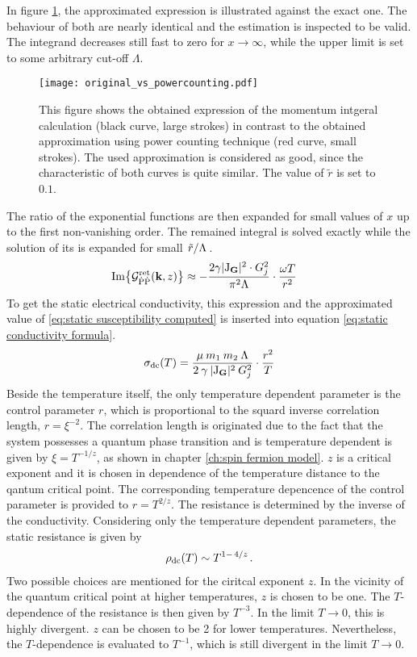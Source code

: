 %
In figure \ref{fig:integrand exact vs approx}, the approximated expression is illustrated against the exact one.
The behaviour of both are nearly identical and the estimation is inspected to be valid.
The integrand decreases still fast to zero for $x \to \infty$, while the upper limit is set to some arbitrary cut-off $\Lambda$.
%
\begin{figure}[t]
	\centering
	\texttt{[image: original\_vs\_powercounting.pdf]}
	\caption{
This figure shows the obtained expression of the momentum intgeral calculation (black curve, large strokes) in contrast to the obtained approximation using power counting technique (red curve, small strokes).
The used approximation is considered as good, since the characteristic of both curves is quite similar.
The value of $\tilde{r}$ is set to $0.1$.
	}
	\label{fig:integrand exact vs approx}
\end{figure}
%
The ratio of the exponential functions are then expanded for small values of $x$ up to the first non-vanishing order.
The remained integral is solved exactly while the solution of its is expanded for small $\flatfrac{\tilde{r}}{\Lambda}$.
%
\begin{align}
	\Im{\mathcal{G}_{\dot{\mathrm{P}}\dot{\mathrm{P}}}^{\mathrm{ret}}(\vb{k}, z)} &\approx 
		-\frac{2 \gamma \vert \mathrm{J}_{\vb{G}} \vert^{2} \cdot G_{j}^{2}}{\pi^{2} \Lambda} \cdot \frac{\omega T}{r^{2}}
\end{align}
%
To get the static electrical conductivity, this expression and the  approximated value of \eqref{eq:static susceptibility computed} is inserted into equation \eqref{eq:static conductivity formula}.
%
\begin{align}
	\sigma_{\mathrm{dc}}(T) = \frac{\mu\: m_{1}\: m_{2}\: \Lambda}{2\: \gamma\: \vert \mathrm{J}_{\vb{G}} \vert^{2}\: G_{j}^{2}} \cdot \frac{r^{2}}{T}
\end{align}
%
Beside the temperature itself, the only temperature dependent parameter is the control parameter $r$, which is proportional to the squard inverse correlation length, $r = \xi^{-2}$.
The correlation length is originated due to the fact that the system possesses a quantum phase transition and is temperature dependent is given by $\xi = T^{-1/z}$, as shown in chapter \ref{ch:spin fermion model}.
$z$ is a critical exponent and it is chosen in dependence of the temperature distance to the qantum critical point.
The corresponding temperature depencence of the control parameter is provided to $r = T^{2/z}$.
The resistance is determined by the inverse of the conductivity.
Considering only the temperature dependent parameters, the static resistance is given by
%
\begin{align}
	\rho_{\mt{dc}}(T) \sim T^{1-\flatfrac{4}{z}}.
	\label{eq:solution resistance}
\end{align}
%
Two possible choices are mentioned for the ciritcal exponent $z$.
In the vicinity of the quantum critical point at higher temperatures, $z$ is chosen to be one.
The $T$-dependence of the resistance is then given by $T^{-3}$.
In the limit $T \to 0$, this is highly divergent.
$z$ can be chosen to be 2 for lower temperatures.
Nevertheless, the $T$-dependence is evaluated to $T^{-1}$, which is still divergent in the limit $T \to 0$.

